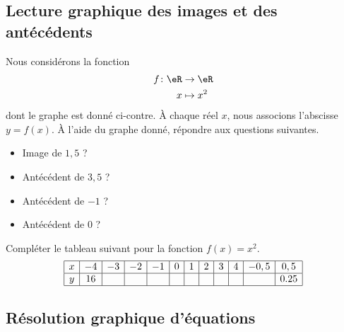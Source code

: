 \subsection{Lecture graphique des images et des antécédents}

\begin{multicols}{2}

    Nous considérons la fonction
    \begin{equation}
        \begin{aligned}
            f\colon \eR&\to \eR \\
            x&\mapsto x^2 
        \end{aligned}
    \end{equation}
    dont le graphe est donné ci-contre. À chaque réel $x$, nous associons l'abscisse $y=f(x)$.  À l'aide du graphe donné, répondre aux questions suivantes.

    \begin{itemize}
        \item Image de $1,5$ ? 
        \item Antécédent de $3,5$ ?  
        \item Antécédent de $-1$ ? 
        \item Antécédent de $0$ ? 
    \end{itemize}

    \columnbreak

    

\end{multicols}

  \begin{example}
Compléter le tableau suivant pour la fonction $f(x)=x^2$.
\begin{equation}
\begin{array}[h]{|c|c|c|c|c|c|c|c|c|c|c|c|}
  \hline  
  x & -4 & -3 & -2 & -1 & 0 & 1 & 2 & 3 & 4 & -0,5 & 0,5  \\
  \hline
  y & 16 &&&&&&&&&&0.25\\
  \hline
\end{array}
\end{equation}
  \end{example}


\subsection{Résolution graphique d'équations}

